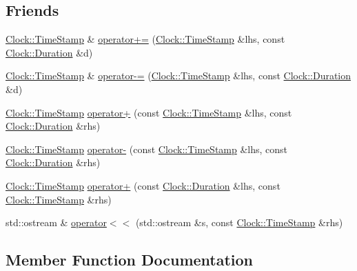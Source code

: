 \subsection*{Friends}
\begin{DoxyCompactItemize}
\item 
\hyperlink{class_clock_1_1_time_stamp}{Clock\+::\+Time\+Stamp} \& \hyperlink{class_clock_1_1_time_stamp_a4ba2a6872ed75f179345c471182c67dc}{operator+=} (\hyperlink{class_clock_1_1_time_stamp}{Clock\+::\+Time\+Stamp} \&lhs, const \hyperlink{class_clock_1_1_duration}{Clock\+::\+Duration} \&d)
\item 
\hyperlink{class_clock_1_1_time_stamp}{Clock\+::\+Time\+Stamp} \& \hyperlink{class_clock_1_1_time_stamp_ae528b7884dfc30e2a28f00c07aa20d24}{operator-\/=} (\hyperlink{class_clock_1_1_time_stamp}{Clock\+::\+Time\+Stamp} \&lhs, const \hyperlink{class_clock_1_1_duration}{Clock\+::\+Duration} \&d)
\item 
\hyperlink{class_clock_1_1_time_stamp}{Clock\+::\+Time\+Stamp} \hyperlink{class_clock_1_1_time_stamp_a0c03a6eab08831e78e238ba6498c40a7}{operator+} (const \hyperlink{class_clock_1_1_time_stamp}{Clock\+::\+Time\+Stamp} \&lhs, const \hyperlink{class_clock_1_1_duration}{Clock\+::\+Duration} \&rhs)
\item 
\hyperlink{class_clock_1_1_time_stamp}{Clock\+::\+Time\+Stamp} \hyperlink{class_clock_1_1_time_stamp_ac693b02ffb2e0b8b9c402642f7f0169f}{operator-\/} (const \hyperlink{class_clock_1_1_time_stamp}{Clock\+::\+Time\+Stamp} \&lhs, const \hyperlink{class_clock_1_1_duration}{Clock\+::\+Duration} \&rhs)
\item 
\hyperlink{class_clock_1_1_time_stamp}{Clock\+::\+Time\+Stamp} \hyperlink{class_clock_1_1_time_stamp_a829ab58b50ec9125fe832b4dfad2cea4}{operator+} (const \hyperlink{class_clock_1_1_duration}{Clock\+::\+Duration} \&lhs, const \hyperlink{class_clock_1_1_time_stamp}{Clock\+::\+Time\+Stamp} \&rhs)
\item 
std\+::ostream \& \hyperlink{class_clock_1_1_time_stamp_a9201b9995d10f34386b474b72ec36407}{operator$<$$<$} (std\+::ostream \&s, const \hyperlink{class_clock_1_1_time_stamp}{Clock\+::\+Time\+Stamp} \&rhs)
\end{DoxyCompactItemize}


\subsection{Member Function Documentation}
